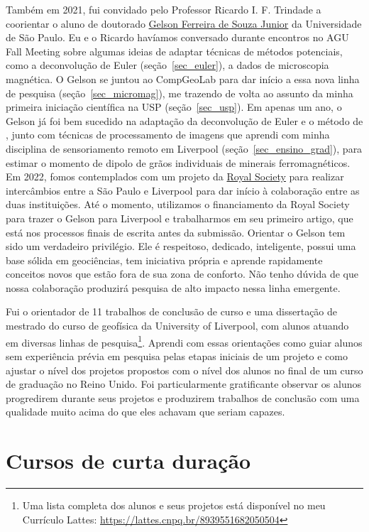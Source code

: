 \documentclass[10pt,a4paper,oneside]{book}
\newcommand{\Lattes}{8939551682050504}
\newcommand{\GelsonLink}{\href{https://www.compgeolab.org/team/\#Souza-junior}{Gelson Ferreira de Souza Junior}}
\begin{document}
Também em 2021, fui convidado pelo Professor Ricardo I. F. Trindade a
coorientar o aluno de doutorado \GelsonLink{} da Universidade de São Paulo.
Eu e o Ricardo havíamos conversado durante encontros no AGU Fall Meeting sobre
algumas ideias de adaptar técnicas de métodos potenciais, como a deconvolução
de Euler (seção~\ref{sec_euler}), a dados de microscopia magnética.
O Gelson se juntou ao CompGeoLab para dar início a essa nova linha de pesquisa
(seção~\ref{sec_micromag}), me trazendo de volta ao assunto da minha primeira
iniciação científica na USP (seção~\ref{sec_usp}).
Em apenas um ano, o Gelson já foi bem sucedido na adaptação da deconvolução de
Euler e o método de \citet{OliveiraJr2015}, junto com técnicas de processamento
de imagens que aprendi com minha disciplina de sensoriamento remoto em
Liverpool (seção~\ref{sec_ensino_grad}), para estimar o momento de dipolo
de grãos individuais de minerais ferromagnéticos.
Em 2022, fomos contemplados com um projeto da
\href{https://royalsociety.org/}{Royal Society} para realizar intercâmbios
entre a São Paulo e Liverpool para dar início à colaboração entre as duas
instituições.
Até o momento, utilizamos o financiamento da Royal Society para trazer o Gelson
para Liverpool e trabalharmos em seu primeiro artigo, que está nos processos
finais de escrita antes da submissão.
Orientar o Gelson tem sido um verdadeiro privilégio.
Ele é respeitoso, dedicado, inteligente, possui uma base sólida em geociências,
tem iniciativa própria e aprende rapidamente conceitos novos que estão fora de
sua zona de conforto.
Não tenho dúvida de que nossa colaboração produzirá pesquisa de alto impacto
nessa linha emergente.

Fui o orientador de 11 trabalhos de conclusão de curso e uma dissertação de
mestrado do curso de geofísica da University of Liverpool, com alunos
atuando em diversas linhas de pesquisa\footnote{Uma lista completa dos alunos
e seus projetos está disponível no meu Currículo Lattes: \url{https://lattes.cnpq.br/\Lattes}}.
Aprendi com essas orientações como guiar alunos sem experiência prévia em
pesquisa pelas etapas iniciais de um projeto e como ajustar o nível dos
projetos propostos com o nível dos alunos no final de um curso de graduação no
Reino Unido.
Foi particularmente gratificante observar os alunos progredirem durante seus
projetos e produzirem trabalhos de conclusão com uma qualidade muito acima do
que eles achavam que seriam capazes.


\section{Cursos de curta duração}
\label{sec_workshops}
\end{document}
